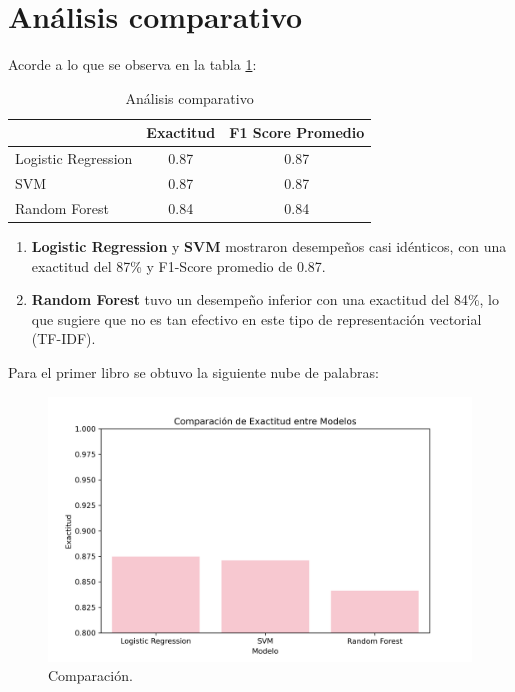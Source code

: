 \documentclass[conference]{IEEEtran}
\begin{document}
\section{Análisis comparativo}

Acorde a lo que se observa en la tabla \ref{tab:comparación}:

\begin{table}[h!]
    \centering
    \begin{tabular}{| l | c | c |}
    \rowcolor[HTML]{FFCCC9} 
    \hline
        \multicolumn{1}{c}{\cellcolor[HTML]{FFCCC9}\textbf{Modelo}} & \textbf{Exactitud} & \textbf{F1 Score Promedio} \\ \hline
        Logistic Regression & 0.87 & 0.87 \\
        SVM & 0.87 & 0.87 \\
        Random Forest & 0.84 & 0.84 \\ \hline
    \end{tabular}
    \caption{Análisis comparativo}
    \label{tab:comparación}
\end{table}

\FloatBarrier

\begin{enumerate}
    \item \textbf{Logistic Regression} y \textbf{SVM} mostraron desempeños casi idénticos, con una exactitud del 87\% y F1-Score promedio de 0.87.
     
    \item \textbf{Random Forest} tuvo un desempeño inferior con una exactitud del 84\%, lo que sugiere que no es tan efectivo en este tipo de representación vectorial (TF-IDF).
\end{enumerate}

Para el primer libro se obtuvo la siguiente nube de palabras:

\begin{figure}[h]
    \centering
    \includegraphics[width=1\linewidth]{Comparacion_Modelos.png}
    \caption{Comparación.}
    \label{fig:comp}
\end{figure}
\end{document}
